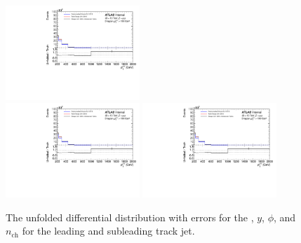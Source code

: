 \begin{figure}[h!]
  \includegraphics[page=287,width=0.45\textwidth]{figures/IBUPlots.pdf} \\
  \includegraphics[page=357,width=0.45\textwidth]{figures/IBUPlots.pdf}
  \includegraphics[page=371,width=0.45\textwidth]{figures/IBUPlots.pdf}
  \caption{The unfolded differential distribution with errors for the \pt, $y$, $\phi$, and $n_{\text{ch}}$ for the leading and subleading track jet.}
  \label{fig:unfoldErr2}
\end{figure}

